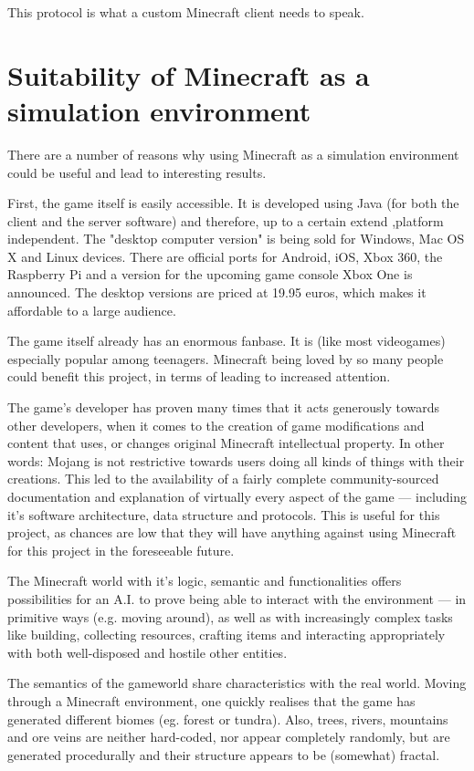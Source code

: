 This protocol is what a custom Minecraft client needs to speak.

        \section{Suitability of Minecraft as a simulation environment}
There are a number of reasons why using Minecraft as a simulation environment could be useful and lead to interesting results.

First, the game itself is easily accessible. It is developed using Java (for both the client and the server software) and therefore, up to a certain extend ,platform independent. The "desktop computer version" is being sold for Windows, Mac OS X and Linux devices. There are official ports for Android, iOS, Xbox 360, the Raspberry Pi and a version for the upcoming game console Xbox One is announced. The desktop versions are priced at 19.95 euros, which makes it affordable to a large audience.

The game itself already has an enormous fanbase. It is (like most videogames) especially popular among teenagers. Minecraft being loved by so many people could benefit this project, in terms of leading to increased attention.

The game's developer has proven many times that it acts generously towards  other developers, when it comes to the creation of game modifications and content that uses, or changes original Minecraft intellectual property. In other words: Mojang is not restrictive towards users doing all kinds of things with their creations. This led to the availability of a fairly complete community-sourced  documentation and explanation of virtually every aspect of the game --- including it's software architecture, data structure and protocols. This is useful for this project, as chances are low that they will have anything against using Minecraft for this project in the foreseeable future. %

The Minecraft world with it's logic, semantic and functionalities offers possibilities for an A.I. to prove being able to interact with the environment --- in primitive ways (e.g. moving around), as well as with increasingly complex tasks like building, collecting resources, crafting items and interacting appropriately with both well-disposed and hostile other entities.

The semantics of the gameworld share characteristics with the real world. Moving through a Minecraft environment, one quickly realises that the game has generated different biomes (eg. forest or tundra). Also, trees, rivers, mountains and ore veins are neither hard-coded, nor appear completely randomly, but are generated procedurally and their structure appears to be (somewhat) fractal.
        
